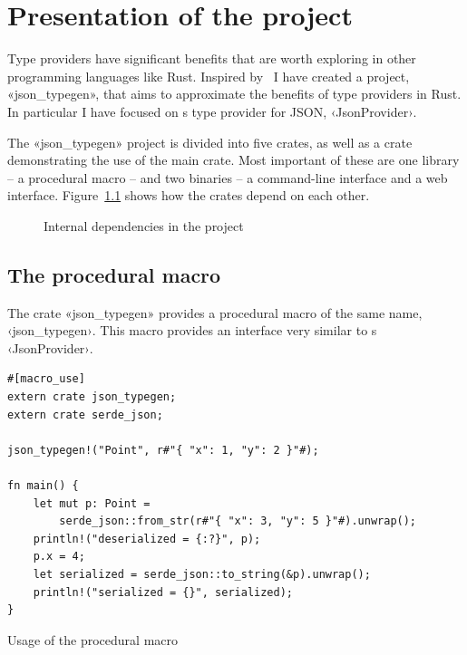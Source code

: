 
\chapter{Presentation of the project}
\label{chap:project-presentation}

Type providers have significant benefits that are worth exploring in other programming languages like Rust. Inspired by \fsharpdata\ I have created a project, «json_typegen», that aims to approximate the benefits of type providers in Rust. In particular I have focused on {\fsharpdata}s type provider for JSON, ‹JsonProvider›.

The «json_typegen» project is divided into five crates, as well as a crate demonstrating the use of the main crate. Most important of these are one library -- a procedural macro -- and two binaries -- a command-line interface and a web interface. Figure~\ref{fig:crates} shows how the crates depend on each other.

\begin{figure}[ht!]
\vspace{2mm}
\centering
{}
\vspace{2mm}
\caption{Internal dependencies in the project}
\label{fig:crates}
\end{figure}

\section{The procedural macro}

The crate «json_typegen» provides a procedural macro of the same name, ‹json_typegen›. This macro provides an interface very similar to {\fsharpdata}s ‹JsonProvider›.

\begin{listing}[ht!]
\begin{verbatim}
#[macro_use]
extern crate json_typegen;
extern crate serde_json;

json_typegen!("Point", r#"{ "x": 1, "y": 2 }"#);

fn main() {
    let mut p: Point =
        serde_json::from_str(r#"{ "x": 3, "y": 5 }"#).unwrap();
    println!("deserialized = {:?}", p);
    p.x = 4;
    let serialized = serde_json::to_string(&p).unwrap();
    println!("serialized = {}", serialized);
}
\end{verbatim}
\caption{Usage of the procedural macro}
\label{lst:proc-macro-example}
\end{listing}


